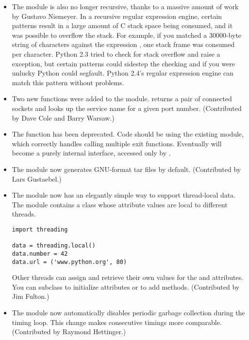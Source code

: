 \documentclass{howto}
\begin{document}
\begin{itemize}
\item The  module is also no longer recursive, thanks to a
massive amount of work by Gustavo Niemeyer.  In a recursive regular
expression engine, certain patterns result in a large amount of C
stack space being consumed, and it was possible to overflow the stack.
For example, if you matched a 30000-byte string of  characters
against the expression , one stack frame was consumed
per character.  Python 2.3 tried to check for stack overflow and raise
a  exception, but certain patterns could
sidestep the checking and if you were unlucky Python could segfault.
Python 2.4's regular expression engine can match this pattern without
problems.

\item Two new functions were added to the  module.
 returns a pair of connected sockets and
 looks up the service name for a
given port number. (Contributed by Dave Cole and Barry Warsaw.)

\item The  function has been deprecated.  Code
should be using the existing  module, which correctly
handles calling multiple exit functions.  Eventually
 will become a purely internal interface,
accessed only by .

\item The  module now generates GNU-format tar files
by default.  (Contributed by Lars Gustaebel.)

\item The  module now has an elegantly simple way to support 
thread-local data.  The module contains a  class whose
attribute values are local to different threads.

\begin{verbatim}
import threading

data = threading.local()
data.number = 42
data.url = ('www.python.org', 80)
\end{verbatim}

Other threads can assign and retrieve their own values for the
 and  attributes.  You can subclass
 to initialize attributes or to add methods.
(Contributed by Jim Fulton.)

\item The  module now automatically disables periodic
  garbage collection during the timing loop.  This change makes
  consecutive timings more comparable.  (Contributed by Raymond Hettinger.)


\end{itemize}
\end{document}
